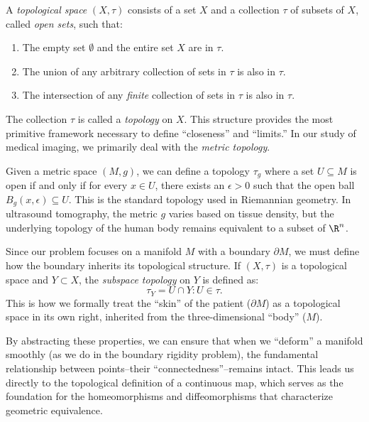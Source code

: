 \begin{definition}
  A \emph{topological space} $(X, \tau)$ consists of a set $X$ and a collection $\tau$ of subsets of $X$, called \emph{open sets}, such that:
  \begin{enumerate}
    \item The empty set $\emptyset$ and the entire set $X$ are in $\tau$.
    \item The union of any arbitrary collection of sets in $\tau$ is also in $\tau$.
    \item The intersection of any \emph{finite} collection of sets in $\tau$ is also in $\tau$.
  \end{enumerate}
\end{definition}

The collection $\tau$ is called a \emph{topology} on $X$. This structure provides the most primitive framework necessary to define ``closeness'' and ``limits.'' In our study of medical imaging, we primarily deal with the \emph{metric topology}.

\begin{example}
  Given a metric space $(M, g)$, we can define a topology $\tau_g$ where a set $U \subseteq M$ is open if and only if for every $x \in U$, there exists an $\epsilon > 0$ such that the open ball $B_g(x, \epsilon) \subseteq U$. This is the standard topology used in Riemannian geometry. In ultrasound tomography, the metric $g$ varies based on tissue density, but the underlying topology of the human body remains equivalent to a subset of $\R^n$.
\end{example}

\begin{example}
  Since our problem focuses on a manifold $M$ with a boundary $\partial M$, we must define how the boundary inherits its topological structure. If $(X, \tau)$ is a topological space and $Y \subset X$, the \emph{subspace topology} on $Y$ is defined as:
  \[%
    \tau_Y = { U \cap Y : U \in \tau }
  .\]%
  This is how we formally treat the ``skin'' of the patient ($\partial M$) as a topological space in its own right, inherited from the three-dimensional ``body'' ($M$).
\end{example}

By abstracting these properties, we can ensure that when we ``deform'' a manifold smoothly (as we do in the boundary rigidity problem), the fundamental relationship between points--their ``connectedness''--remains intact. This leads us directly to the topological definition of a continuous map, which serves as the foundation for the homeomorphisms and diffeomorphisms that characterize geometric equivalence.

